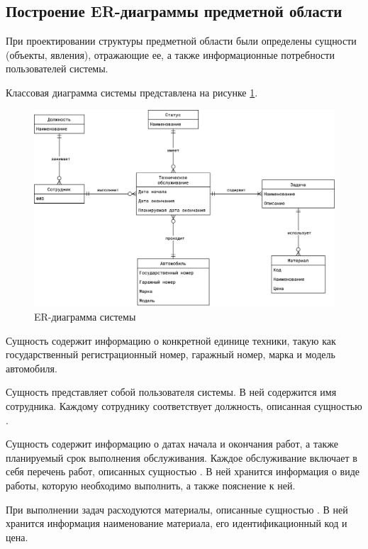 \documentclass[../nirs.tex]{subfiles}
\begin{document}
\subsection{Построение ER-диаграммы предметной области}

При проектировании структуры предметной области были определены сущности
(объекты, явления), отражающие ее, а также информационные потребности
пользователей системы.

Классовая диаграмма системы представлена на рисунке \ref{fig:2_1_er_diagram}.

\clearpage
\begin{landscape}

\begin{figure}[hp!]
  \centering
  \includegraphics[keepaspectratio,
                   width=1.4\textwidth]{./images/er-2.png}
  \caption{ER-диаграмма системы}
  \label{fig:2_1_er_diagram}
\end{figure}

\end{landscape}
\clearpage

Сущность  содержит информацию о конкретной единице
техники, такую как государственный регистрационный номер, гаражный номер, марка
и модель автомобиля.

Сущность  представляет собой пользователя системы.
В ней содержится имя сотрудника. Каждому сотруднику соответствует должность,
описанная сущностью .

Сущность  содержит информацию о датах начала
и окончания работ, а также планируемый срок выполнения обслуживания. Каждое
обслуживание включает в себя перечень работ, описанных сущностью
. В ней хранится информация о виде работы, которую необходимо
выполнить, а также пояснение к ней.

При выполнении задач расходуются материалы, описанные сущностью
. В ней хранится информация наименование материала, его
идентификационный код и цена.
\end{document}
